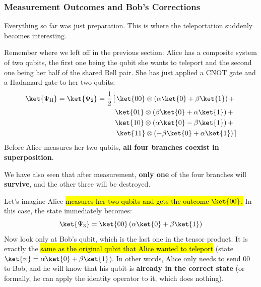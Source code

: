 \subsubsection{Measurement Outcomes and Bob's Corrections}\label{sec:measurement-outcomes-and-bobs-corrections}

Everything so far was just preparation. This is where the teleportation suddenly becomes interesting.

\highspace
Remember where we left off in the previous section: Alice has a composite system of two qubits, the first one being the qubit she wants to teleport and the second one being her half of the shared Bell pair. She has just applied a CNOT gate and a Hadamard gate to her two qubits:
\begin{equation*}
    \begin{aligned}
        \ket{\Psi_{\text{H}}} = \ket{\Psi_{2}} &= \frac{1}{2} \left[ \,
            \ket{00} \otimes \left(\alpha\ket{0} + \beta\ket{1}\right) + \right. \\
            & \hspace{0.88cm} \ket{01} \otimes \left(\beta\ket{0} + \alpha\ket{1}\right) + \\
            & \hspace{0.88cm} \ket{10} \otimes \left(\alpha\ket{0} - \beta\ket{1}\right) + \\
            & \hspace{0.84cm} \left. \ket{11} \otimes \left(-\beta\ket{0} + \alpha\ket{1}\right)
        \, \right]
    \end{aligned}
\end{equation*}
Before Alice measures her two qubits, \textbf{all four branches coexist in superposition}.

\highspace
We have also seen that after measurement, \textbf{only one} of the four branches will \textbf{survive}, and the other three will be destroyed.

\highspace
Let's imagine Alice \hl{measures her two qubits and gets the outcome $\ket{00}$.} In this case, the state immediately becomes:
\begin{equation*}
    \ket{\Psi_3} = \ket{00}\left(\alpha\ket{0} + \beta\ket{1}\right)
\end{equation*}
Now look only at Bob's qubit, which is the last one in the tensor product. It is exactly the \hl{same as the original qubit that Alice wanted to teleport} (state $\ket{\psi} = \alpha\ket{0} + \beta\ket{1}$). In other words, Alice only needs to send $00$ to Bob, and he will know that his qubit is \textbf{already in the correct state} (or formally, he can apply the identity operator to it, which does nothing).

